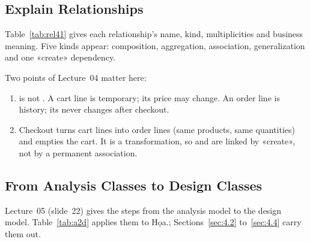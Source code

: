 \subsection{Explain Relationships}\label{sec:4.1.3}

Table~\ref{tab:rel41} gives each relationship's name, kind, multiplicities and business meaning. Five kinds appear:
composition, aggregation, association, generalization and one «create» dependency.



Two points of Lecture~04 matter here:
\begin{enumerate}
\item {} is not . A cart line is temporary; its price may change. An order line is
history; its  never changes after checkout.
\item Checkout turns cart lines into order lines (same products, same quantities) and empties the cart. It is a
transformation, so  and  are linked by «create», not by a permanent association.
\end{enumerate}

\subsection{From Analysis Classes to Design Classes}\label{sec:4.1.4}

Lecture~05 (slide~22) gives the steps from the analysis model to the design model. Table~\ref{tab:a2d} applies them
to Họa.; Sections~\ref{sec:4.2} to~\ref{sec:4.4} carry them out.


